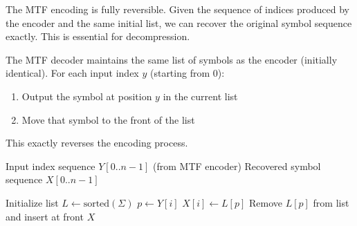 The MTF encoding is fully reversible. Given the sequence of indices produced by the encoder and the same initial list, we can recover the original symbol sequence exactly. This is essential for decompression.

\begin{definitionbox}
The MTF decoder maintains the same list of symbols as the encoder (initially identical). For each input index \(y\) (starting from 0):
\begin{enumerate}
    \item Output the symbol at position \(y\) in the current list
    \item Move that symbol to the front of the list
\end{enumerate}
This exactly reverses the encoding process.
\end{definitionbox}

\begin{algorithm}[H]
\caption{Move-To-Front Decoding}
\begin{algorithmic}[1]
\Require Input index sequence \(Y[0..n-1]\) (from MTF encoder)
\Ensure Recovered symbol sequence \(X[0..n-1]\)

\State Initialize list \(L \gets \text{sorted}(\Sigma)\) 
    \State \(p \gets Y[i]\) 
    \State \(X[i] \gets L[p]\) 
    \State Remove \(L[p]\) from list and insert at front
\EndFor
\State \Return \(X\)
\end{algorithmic}
\end{algorithm}

